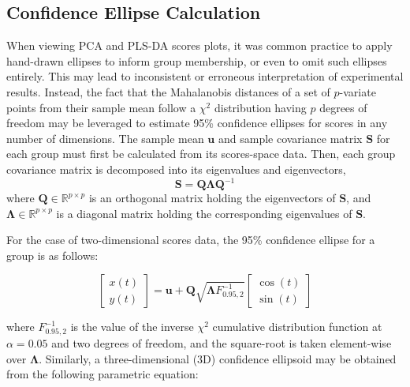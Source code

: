 \subsection{Confidence Ellipse Calculation}

\begin{doublespace}
When viewing PCA and PLS-DA scores plots, it was common practice to apply
hand-drawn ellipses to inform group membership, or even to omit such ellipses
entirely. This may lead to inconsistent or erroneous interpretation of
experimental results. Instead, the fact that the Mahalanobis distances of a
set of $p$-variate points from their sample mean follow a $\chi^2$ distribution
having $p$ degrees of freedom \cite{hotelling:ams1931} may be leveraged
to estimate 95\% confidence ellipses for scores in any number of dimensions.
The sample mean $\mathbf{u}$ and sample covariance matrix $\mathbf{S}$ for each
group must first be calculated from its scores-space data. Then, each group
covariance matrix is decomposed into its eigenvalues and eigenvectors,
\begin{equation}
\mathbf{S} = \mathbf{Q} \mathbf{\Lambda} \mathbf{Q}^{-1}
\end{equation}
where $\mathbf{Q} \in \mathbb{R}^{p \times p}$ is an orthogonal matrix holding
the eigenvectors of $\mathbf{S}$, and
$\mathbf{\Lambda} \in \mathbb{R}^{p \times p}$ is a diagonal matrix holding the
corresponding eigenvalues of $\mathbf{S}$.

For the case of two-dimensional scores data, the 95\% confidence ellipse for a
group is as follows:
\end{doublespace}

\begin{equation}
\begin{bmatrix}
x(t) \\
y(t)
\end{bmatrix}
 = \mathbf{u} + \mathbf{Q} \sqrt{\mathbf{\Lambda} F_{0.95,2}^{-1}}
\begin{bmatrix}
\cos(t) \\
\sin(t)
\end{bmatrix}
\end{equation}

\begin{doublespace}
where $F_{0.95,2}^{-1}$ is the value of the inverse $\chi^2$ cumulative
distribution function at $\alpha = 0.05$ and two degrees of freedom, and the
square-root is taken element-wise over $\mathbf{\Lambda}$. Similarly, a
three-dimensional (3D) confidence ellipsoid may be obtained from the
following parametric equation:
\end{doublespace}

